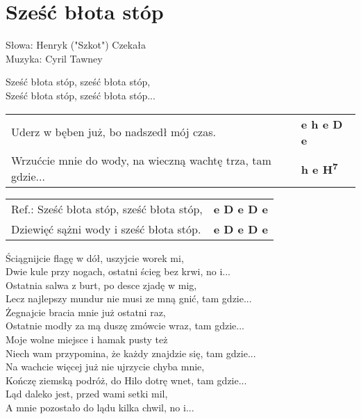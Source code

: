 \section{Sześć błota stóp}

Słowa: Henryk ("Szkot") Czekała \\
Muzyka: Cyril Tawney

\vspace{2em}
Sześć błota stóp, sześć błota stóp, \\
Sześć błota stóp, sześć błota stóp... \\

\vspace{1em}
\begin{tabular}{@{}p{10cm}@{}l@{}}
Uderz w bęben już, bo nadszedł mój czas. & \bfseries e h e D e \\
Wrzućcie mnie do wody, na wieczną wachtę trza, tam gdzie... & \bfseries h e H\textsuperscript{7} \\
\end{tabular}

\vspace{1em}
\begin{tabular}{@{}p{10cm}@{}l@{}}
Ref.: Sześć błota stóp, sześć błota stóp, & \bfseries e D e D e \\
Dziewięć sążni wody i sześć błota stóp. & \bfseries e D e D e \\
\end{tabular}

\vspace{1em}
Ściągnijcie flagę w dół, uszyjcie worek mi, \\
Dwie kule przy nogach, ostatni ścieg bez krwi, no i... \\

Ostatnia salwa z burt, po desce zjadę w mig, \\
Lecz najlepszy mundur nie musi ze mną gnić, tam gdzie... \\

Żegnajcie bracia mnie już ostatni raz, \\
Ostatnie modły za mą duszę zmówcie wraz, tam gdzie... \\

Moje wolne miejsce i hamak pusty też \\
Niech wam przypomina, że każdy znajdzie się, tam gdzie... \\

Na wachcie więcej już nie ujrzycie chyba mnie, \\
Kończę ziemską podróż, do Hilo dotrę wnet, tam gdzie... \\

Ląd daleko jest, przed wami setki mil, \\
A mnie pozostało do lądu kilka chwil, no i...